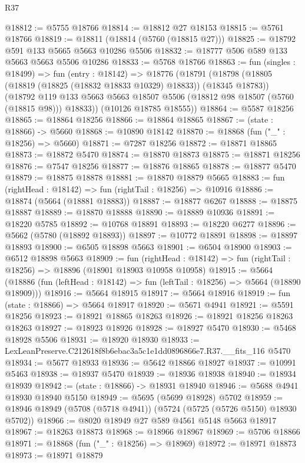 \begin{lexlean}{R37}
\begin{coremodule}
@18812 := @5755 @18766
@18814 := @18812 @27 @18153
@18815 := @5761 @18766
@18819 := @18811 (@18814 (@5760 (@18815 @27)))
@18825 := @18792 @591 @133 @5665 @5663 @10286 @5506
@18832 := @18777 @506 @589 @133 @5663 @5663 @5506 @10286
@18833 := @5768 @18766
@18863 := fun (singles : @18499) =>
  fun (entry : @18142) =>
  @18776
    (@18791
      (@18798
        (@18805 (@18819 (@18825 (@18832 @18833 @10329) @18833)) (@18345 @18783))
        (@18792 @119 @133 @5663 @5663 @18507 @5506 (@18812 @98 @18507 (@5760 (@18815 @98))) @18833))
      (@10126 @18785 @18555))
@18864 := @5587 @18256
@18865 := @18864 @18256
@18866 := @18864 @18865
@18867 := (state : @18866) -> @5660
@18868 := @10890 @18142
@18870 := @18868 (fun ("_" : @18256) => @5660)
@18871 := @7287 @18256
@18872 := @18871 @18865
@18873 := @18872 @5470
@18874 := @18870 @18873
@18875 := @18871 @18256
@18876 := @7547 @18256
@18877 := @18876 @18865
@18878 := @18877 @5470
@18879 := @18875 @18878
@18881 := @18870 @18879 @5665
@18883 := fun (rightHead : @18142) => fun (rightTail : @18256) => @10916
@18886 := @18874 (@5664 (@18881 @18883))
@18887 := @18877 @6267
@18888 := @18875 @18887
@18889 := @18870 @18888
@18890 := @18889 @10936
@18891 := @18220 @5785
@18892 := @10768 @18891
@18893 := @18220 @6277
@18896 := @5662 (@5780 (@18892 @18893))
@18897 := @10772 @18891
@18898 := @18897 @18893
@18900 := @6505 @18898 @5663
@18901 := @6504 @18900
@18903 := @6512 @18898 @5663
@18909 := fun (rightHead : @18142) =>
  fun (rightTail : @18256) => @18896 (@18901 @18903 @10958 @10958)
@18915 := @5664
    (@18886 (fun (leftHead : @18142) => fun (leftTail : @18256) => @5664 (@18890 @18909)))
@18916 := @5664 @18915
@18917 := @5664 @18916
@18919 := fun (state : @18866) => @5664 @18917
@18920 := @5671 @4941
@18921 := @5591 @18256
@18923 := @18921 @18865 @18263
@18926 := @18921 @18256 @18263 @18263
@18927 := @18923 @18926
@18928 := @18927 @5470
@18930 := @5468 @18928 @5506
@18931 := @18920 @18930
@18933 := LexLeanPreserve.C212618f8b6ebac3a5c1e1dd0896866e7.R37.__fits_116 @5470
@18934 := @5677 @18933
@18936 := @5642 @18866 @18927
@18937 := @10991 @5463
@18938 := @18937 @5470
@18939 := @18936 @18938
@18940 := @18934 @18939
@18942 := (state : @18866) -> @18931 @18940
@18946 := @5688 @4941 @18930 @18940 @5150
@18949 := @5695 (@5699 @18928) @5702
@18959 := @18946 @18949 (@5708 (@5718 @4941)) (@5724 (@5725 (@5726 @5150) @18930 @5702))
@18966 := @8020 @18949 @27 @589 @4561 @5148 @5663 @18917
@18967 := @18263 @18873
@18968 := @18966 @18967
@18969 := @5706 @18866
@18971 := @18868 (fun ("_" : @18256) => @18969)
@18972 := @18971 @18873
@18973 := @18971 @18879

\end{coremodule}
\end{lexlean}
